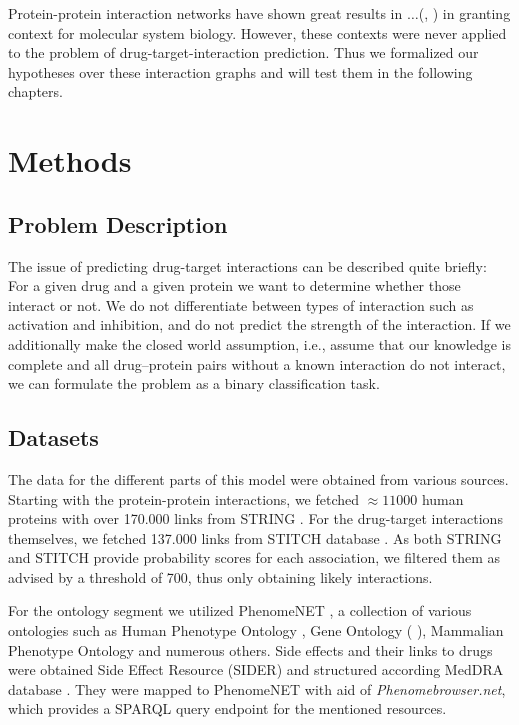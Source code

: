 \documentclass{bioinfo}
\renewcommand{\cite}{\citep}
\begin{document}
Protein-protein interaction networks have shown great results in $\dots$(\cite{Vazquez2003}, \cite{Ackerman2019}) in granting context for molecular system biology. However, these contexts were never applied to the problem of drug-target-interaction prediction. Thus we formalized our hypotheses over these interaction graphs and will test them in the following chapters.

\enlargethispage{12pt}

\section{Methods}
\subsection{Problem Description}
The issue of predicting drug-target interactions can be described
quite briefly: For a given drug and a given protein we want to
determine whether those interact or not.  We do not differentiate
between types of interaction such as activation and inhibition, and do
not predict the strength of the interaction.  If we additionally make
the closed world assumption, i.e., assume that our knowledge is
complete and all drug--protein pairs without a known interaction do
not interact, we can formulate the problem as a binary classification
task.


\subsection{Datasets}
The data for the different parts of this model were obtained from
various sources. Starting with the protein-protein interactions, we
fetched $\approx 11000$ human proteins with over 170.000 links from
STRING \citep{STRINGv10}. For the drug-target interactions themselves,
we fetched 137.000 links from STITCH database \citep{STITCHv5}. As
both STRING and STITCH provide probability scores for each
association, we filtered them as advised by a threshold of 700, thus
only obtaining likely interactions.

For the ontology segment we utilized PhenomeNET \citep{PhenomeNET2011}, a collection of various ontologies such as Human Phenotype Ontology \citep{HPO2018}, Gene Ontology (\citet{GOoriginal2000} \citet{GOrecent2020}), Mammalian Phenotype Ontology \citep{MP2009} and numerous others. 
Side effects and their links to drugs were obtained Side Effect Resource (SIDER)\citep{SIDER} and structured according MedDRA database \citep{MedDRA}. They were mapped to PhenomeNET with aid of \textit{Phenomebrowser.net}, which provides a SPARQL query endpoint for the mentioned resources. \\
\end{document}
